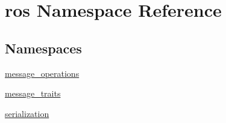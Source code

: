 \hypertarget{namespaceros}{}\section{ros Namespace Reference}
\label{namespaceros}
\subsection*{Namespaces}
\begin{DoxyCompactItemize}
\item 
 \hyperlink{namespaceros_1_1message__operations}{message\+\_\+operations}
\item 
 \hyperlink{namespaceros_1_1message__traits}{message\+\_\+traits}
\item 
 \hyperlink{namespaceros_1_1serialization}{serialization}
\end{DoxyCompactItemize}
